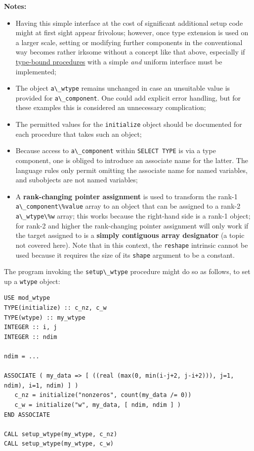 \documentclass[
  paper=a4,
  ,captions=tableheading
]{scrartcl}
\newcommand{\passthrough}[1]{#1}
\providecommand{\tightlist}{%
  \setlength{\itemsep}{0pt}\setlength{\parskip}{0pt}}
\begin{document}
\textbf{Notes:}

\begin{itemize}
\tightlist
\item
  Having this simple interface at the cost of significant additional
  setup code might at first sight appear frivolous; however, once type
  extension is used on a larger scale, setting or modifying further
  components in the conventional way becomes rather irksome without a
  concept like that above, especially if \hyperref[sec:tbp]{type-bound
  procedures} with a simple \emph{and} uniform interface must be
  implemented;
\item
  The object \passthrough{\lstinline!a\_wtype!} remains unchanged in
  case an unsuitable value is provided for
  \passthrough{\lstinline!a\_component!}. One could add explicit error
  handling, but for these examples this is considered an unnecessary
  complication;
\item
  The permitted values for the \passthrough{\lstinline!initialize!}
  object should be documented for each procedure that takes such an
  object;
\item
  Because access to \passthrough{\lstinline!a\_component!} within
  \passthrough{\lstinline!SELECT TYPE!} is via a type component, one is
  obliged to introduce an associate name for the latter. The language
  rules only permit omitting the associate name for named variables, and
  subobjects are not named variables;
\item
  A \textbf{rank-changing pointer assignment} is used to transform the
  rank-1 \passthrough{\lstinline!a\_component\%value!} array to an
  object that can be assigned to a rank-2
  \passthrough{\lstinline!a\_wtype\%w!} array; this works because the
  right-hand side is a rank-1 object; for rank-2 and higher the
  rank-changing pointer assignment will only work if the target assigned
  to is a \textbf{simply contiguous array designator} (a topic not
  covered here). Note that in this context, the
  \passthrough{\lstinline!reshape!} intrinsic cannot be used because it
  requires the size of its \passthrough{\lstinline!shape!} argument to
  be a constant.
\end{itemize}

The program invoking the \passthrough{\lstinline!setup\_wtype!}
procedure might do so as follows, to set up a
\passthrough{\lstinline!wtype!} object:

\begin{lstlisting}
USE mod_wtype
TYPE(initialize) :: c_nz, c_w
TYPE(wtype) :: my_wtype
INTEGER :: i, j
INTEGER :: ndim

ndim = ...

ASSOCIATE ( my_data => [ ((real (max(0, min(i-j+2, j-i+2))), j=1, ndim), i=1, ndim) ] )
   c_nz = initialize("nonzeros", count(my_data /= 0))
   c_w = initialize("w", my_data, [ ndim, ndim ] )
END ASSOCIATE

CALL setup_wtype(my_wtype, c_nz)
CALL setup_wtype(my_wtype, c_w)
\end{lstlisting}
\end{document}
